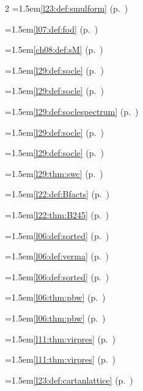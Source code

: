 \begin{multicols}{2}
\hangindent=1.5em\quad \ref{l23:def:smulform} (p.~\pageref{l23:def:smulform})\par
\hangindent=1.5em\quad \ref{l07:def:fod} (p.~\pageref{l07:def:fod})\par
\hangindent=1.5em\quad \ref{ch08:def:sM} (p.~\pageref{ch08:def:sM})\par
\hangindent=1.5em\quad \ref{l29:def:socle} (p.~\pageref{l29:def:socle})\par
\hangindent=1.5em\quad \ref{l29:def:socle} (p.~\pageref{l29:def:socle})\par
\hangindent=1.5em\quad \ref{l29:def:soclespectrum} (p.~\pageref{l29:def:soclespectrum})\par
\hangindent=1.5em\quad \ref{l29:def:socle} (p.~\pageref{l29:def:socle})\par
\hangindent=1.5em\quad \ref{l29:def:socle} (p.~\pageref{l29:def:socle})\par
\hangindent=1.5em\quad \ref{l29:thm:swc} (p.~\pageref{l29:thm:swc})\par
\hangindent=1.5em\quad \ref{l22:def:Bfacts} (p.~\pageref{l22:def:Bfacts})\par
\hangindent=1.5em\quad \ref{l22:thm:B245} (p.~\pageref{l22:thm:B245})\par
\hangindent=1.5em\quad \ref{l06:def:sorted} (p.~\pageref{l06:def:sorted})\par
\hangindent=1.5em\quad \ref{l06:def:verma} (p.~\pageref{l06:def:verma})\par
\hangindent=1.5em\quad \ref{l06:def:sorted} (p.~\pageref{l06:def:sorted})\par
\hangindent=1.5em\quad \ref{l06:thm:pbw} (p.~\pageref{l06:thm:pbw})\par
\hangindent=1.5em\quad \ref{l06:thm:pbw} (p.~\pageref{l06:thm:pbw})\par
\hangindent=1.5em\quad \ref{l11:thm:virpres} (p.~\pageref{l11:thm:virpres})\par
\hangindent=1.5em\quad \ref{l11:thm:virpres} (p.~\pageref{l11:thm:virpres})\par
\hangindent=1.5em\quad \ref{l23:def:cartanlattice} (p.~\pageref{l23:def:cartanlattice})\par

\end{multicols}
